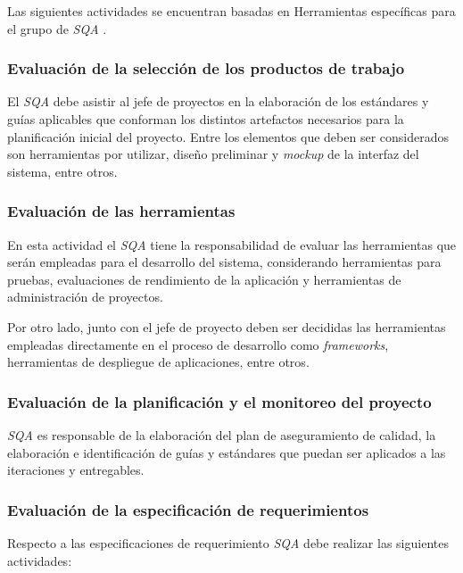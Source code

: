 Las siguientes actividades se encuentran basadas en Herramientas específicas para el grupo de \textit{SQA} \citet{web00}.

\subsubsection{Evaluación de la selección de los productos de trabajo}

El \textit{SQA} debe asistir al jefe de proyectos en la elaboración de los estándares y guías aplicables que conforman los distintos artefactos necesarios para la planificación inicial del proyecto. Entre los elementos que deben ser considerados son herramientas por utilizar, diseño preliminar y \textit{mockup} de la interfaz del sistema, entre otros.

\subsubsection{Evaluación de las herramientas} 

En esta actividad el \textit{SQA} tiene la responsabilidad de evaluar las herramientas que serán empleadas para el desarrollo del sistema, considerando herramientas para pruebas, evaluaciones de rendimiento de la aplicación y herramientas de administración de proyectos.

Por otro lado, junto con el jefe de proyecto deben ser decididas las herramientas empleadas directamente en el proceso de desarrollo como \textit{frameworks}, herramientas de despliegue de aplicaciones, entre otros.

\subsubsection{Evaluación de la planificación y el monitoreo del proyecto}

\textit{SQA} es responsable de la elaboración del plan de aseguramiento de calidad, la elaboración e identificación de guías y estándares que puedan ser aplicados a las iteraciones y entregables.

\subsubsection{Evaluación de la especificación de requerimientos}

Respecto a las especificaciones de requerimiento \textit{SQA} debe realizar las siguientes actividades:

